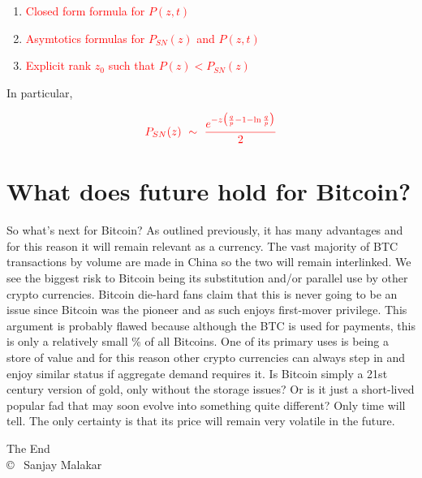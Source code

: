 \documentclass{article}
\begin{document}
\begin{enumerate}
        \item \textcolor{red}{Closed form formula for $P(z,t)$}
        
        \item \textcolor{red}{Asymtotics formulas for $P_{SN}(z)$ and $P(z,t)$}
        
        \item \textcolor{red}{Explicit rank $z_0$ such that $P(z)<P_{SN}(z)$}
\end{enumerate}

\vspace{1.2cm}
In particular,

        \begin{equation}
        \textcolor{red}{
            P_{SN}(z) ~ \sim ~ \frac{e^{-z\big(\frac{q}{p}-1-\ln\frac{q}{p}\big)}}{2}
            }
        \end{equation}
 
\newpage


\section{What does future hold for Bitcoin?} 
So what’s next for Bitcoin? As outlined previously, it has many advantages and for this reason it will remain relevant as a currency. The vast majority of BTC transactions by volume are made in China so the two will remain interlinked.
\newline\newline
We see the biggest risk to Bitcoin being its substitution and/or parallel use by other crypto currencies. Bitcoin die-hard fans claim that this is never going to be an issue since Bitcoin was the pioneer and as such enjoys first-mover privilege. This argument is probably flawed because although the BTC is used for payments, this is only a relatively small \% of all Bitcoins. One of its primary uses is being a store of value and for this reason other crypto currencies can always step in and enjoy similar status if aggregate demand requires it.
\newline\newline
Is Bitcoin simply a 21st century version of gold, only without the storage issues? Or is it just a short-lived popular fad that may soon evolve into something quite different? Only time will tell. The only certainty is that its price will remain very volatile in the future.

\vspace*{\fill}
\centering
The End\\ \copyright~ Sanjay Malakar
\end{document}
